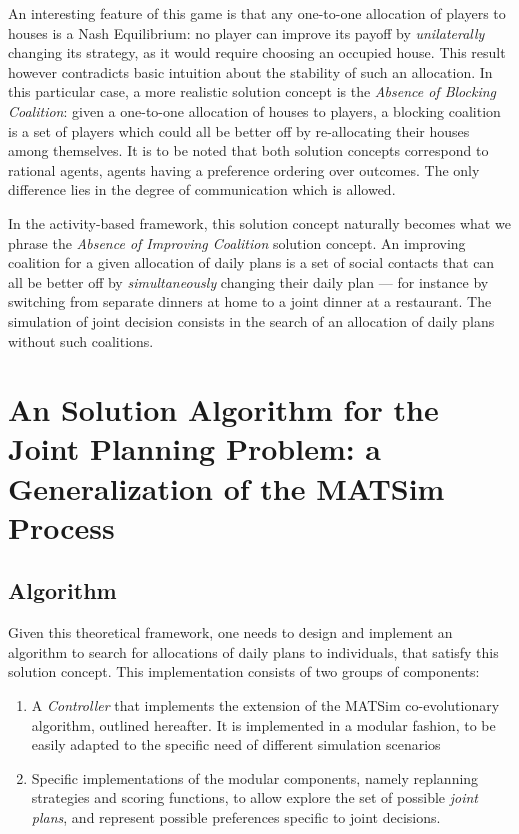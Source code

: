 {An interesting feature of this game is that any one-to-one allocation of players to houses is a
Nash Equilibrium: no player can improve its payoff by \emph{unilaterally} changing its strategy,
as it would require choosing an occupied house.
This result however contradicts basic intuition about the stability of such an allocation.
In this particular case, a more realistic solution concept is the \emph{Absence of Blocking Coalition}:
given a one-to-one allocation of houses to players, a blocking coalition is a set of players
which could all be better off by re-allocating their houses among themselves.
%
It is to be noted that both solution concepts correspond to rational agents, \ie agents having
a preference ordering over outcomes.
The only difference lies in the degree
of communication which is allowed.

In the activity-based framework, this solution concept naturally becomes what we phrase
the \emph{Absence of Improving Coalition} solution concept.
An improving coalition for a given allocation of daily plans
is a set of social contacts that can all be better off by \emph{simultaneously} changing
their daily plan
--- for instance by switching from separate dinners at home to a joint dinner at a restaurant.
The simulation of joint decision consists in the search of an allocation of daily plans
without such coalitions.


\section{An Solution Algorithm for the Joint Planning Problem: a Generalization of the MATSim Process\label{sec:td:algo}}
\subsection{Algorithm}

Given this theoretical framework, one needs to design and implement an
algorithm to search for allocations of daily plans to individuals, that
satisfy this solution concept.
This implementation consists of two
groups of components:

\begin{enumerate}
\item
  A \emph{Controller} that implements the extension of the MATSim
  co-evolutionary algorithm, outlined hereafter. It is implemented in a
  modular fashion, to be easily adapted to the specific need of
  different simulation scenarios
\item
  Specific implementations of the modular components,
  namely replanning strategies and scoring functions,
  to allow explore the set of possible \emph{joint plans},
  and represent possible preferences specific to joint decisions.
\end{enumerate}

}

